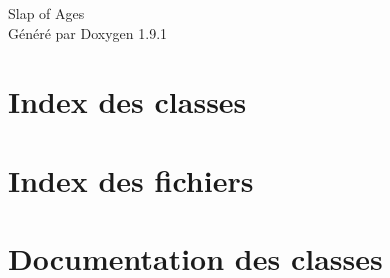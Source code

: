 \let\mypdfximage\pdfximage\def\pdfximage{\immediate\mypdfximage}\documentclass[twoside]{book}
\newcommand{\+}{\discretionary{\mbox{\scriptsize$\hookleftarrow$}}{}{}}
\newcommand{\clearemptydoublepage}{%
  \newpage{\pagestyle{empty}\cleardoublepage}%
}
\begin{document}
\raggedbottom

\hypersetup{pageanchor=false,
             bookmarksnumbered=true,
             pdfencoding=unicode
            }
\begin{titlepage}
\vspace*{7cm}
\begin{center}%
{\Large Slap of Ages }\\
\vspace*{1cm}
{\large Généré par Doxygen 1.9.1}\\
\end{center}
\end{titlepage}
\clearemptydoublepage
{}
\tableofcontents
\clearemptydoublepage
{}
\hypersetup{pageanchor=true}

\chapter{Index des classes}

\chapter{Index des fichiers}

\chapter{Documentation des classes}

































\end{document}
